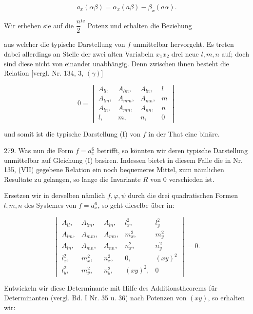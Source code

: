\[
a_x(\alpha\beta) = \alpha_x(a\beta) - \beta_x(a\alpha).
\]

Wir erheben sie auf die $\dfrac{n}{2}^{\text{te}}$ Potenz und erhalten die Beziehung


aus welcher die typische Darstellung von $f$ unmittelbar hervorgeht. Es treten dabei allerdings an Stelle der zwei alten Variabeln $x_1x_2$ drei neue $l, m, n$ auf; doch sind diese nicht von einander unabhängig. Denn zwischen ihnen besteht die Relation [vergl. Nr. 134, 3, $(\gamma)$]

\[
0 = \begin{vmatrix}
A_{ll}, & A_{lm}, & A_{ln}, & l \\
A_{lm}, & A_{mm}, & A_{mn}, & m \\
A_{ln}, & A_{mn}, & A_{nn}, & n \\
l, & m, & n, & 0
\end{vmatrix}
\]

und somit ist die typische Darstellung (I) von $f$ in der That eine binäre.



279. Was nun die Form $f = a_x^6$ betrifft, so könnten wir deren typische Darstellung unmittelbar auf Gleichung (I) basiren. Indessen bietet in diesem Falle die in Nr. 135, (VII) gegebene Relation ein noch bequemeres Mittel, zum nämlichen Resultate zu gelangen, so lange die Invariante $R$ von $0$ verschieden ist.

Ersetzen wir in derselben nämlich $f, \varphi, \psi$ durch die drei quadratischen Formen $l, m, n$ des Systemes von $f = a_x^6$, so geht dieselbe über in:

\[
\begin{vmatrix}
A_{ll}, & A_{lm}, & A_{ln}, & l_x^2, & l_y^2 \\
A_{lm}, & A_{mm}, & A_{mn}, & m_x^2, & m_y^2 \\
A_{ln}, & A_{mn}, & A_{nn}, & n_x^2, & n_y^2 \\
l_x^2, & m_x^2, & n_x^2, & 0, & (xy)^2 \\
l_y^2, & m_y^2, & n_y^2, & (xy)^2, & 0
\end{vmatrix} = 0.
\]

Entwickeln wir diese Determinante mit Hilfe des Additionstheorems für Determinanten (vergl. Bd. I Nr. 35 u. 36) nach Potenzen von $(xy)$, so erhalten wir:

